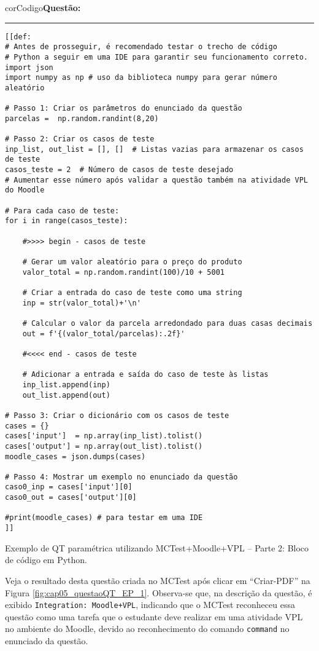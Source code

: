\begin{listing}[!ht]
\begin{myboxCode}{corCodigo}{\textbf{Questão: } }\vspace{3mm}
\hrule
\begin{verbatim}
[[def: 
# Antes de prosseguir, é recomendado testar o trecho de código  
# Python a seguir em uma IDE para garantir seu funcionamento correto.
import json
import numpy as np # uso da biblioteca numpy para gerar número aleatório 

# Passo 1: Criar os parâmetros do enunciado da questão
parcelas =  np.random.randint(8,20)

# Passo 2: Criar os casos de teste
inp_list, out_list = [], []  # Listas vazias para armazenar os casos de teste
casos_teste = 2  # Número de casos de teste desejado
# Aumentar esse número após validar a questão também na atividade VPL do Moodle

# Para cada caso de teste:
for i in range(casos_teste):    

    #>>>> begin - casos de teste

    # Gerar um valor aleatório para o preço do produto
    valor_total = np.random.randint(100)/10 + 5001 

    # Criar a entrada do caso de teste como uma string
    inp = str(valor_total)+'\n'

    # Calcular o valor da parcela arredondado para duas casas decimais
    out = f'{(valor_total/parcelas):.2f}'

    #<<<< end - casos de teste

    # Adicionar a entrada e saída do caso de teste às listas
    inp_list.append(inp)
    out_list.append(out)

# Passo 3: Criar o dicionário com os casos de teste
cases = {}
cases['input']  = np.array(inp_list).tolist()
cases['output'] = np.array(out_list).tolist()
moodle_cases = json.dumps(cases)

# Passo 4: Mostrar um exemplo no enunciado da questão
caso0_inp = cases['input'][0]
caso0_out = cases['output'][0]

#print(moodle_cases) # para testar em uma IDE
]]
\end{verbatim}
\end{myboxCode}
\caption{Exemplo de QT paramétrica utilizando MCTest+Moodle+VPL -- Parte 2: Bloco de código em Python.}
\label{lst:questaoQT_EP_1_parte2}
\end{listing}

Veja o resultado desta questão criada no MCTest após clicar em ``Criar-PDF'' na Figura \ref{fig:cap05_questaoQT_EP_1}. Observa-se que, na descrição da questão, é exibido \verb|Integration: Moodle+VPL|, indicando que o MCTest reconheceu essa questão como uma tarefa que o estudante deve realizar em uma atividade VPL no ambiente do Moodle, devido ao reconhecimento do comando \verb|command| no enunciado da questão.


